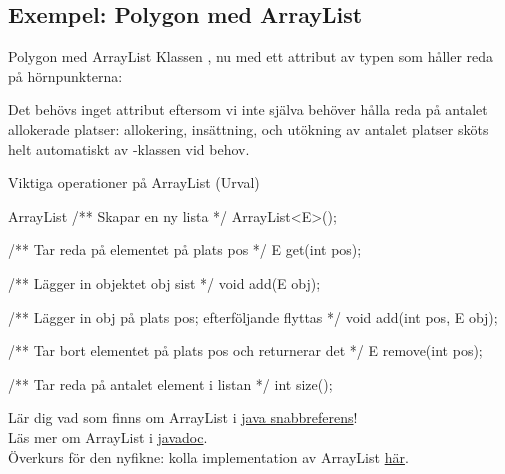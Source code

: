 \subsection{Exempel: Polygon med ArrayList}
\begin{Slide}{Polygon med ArrayList}
Klassen , nu med ett attribut av typen  som håller reda på hörnpunkterna:
\begin{Code}[numberstyle=]
public class Polygon {
    private ArrayList<Point> vertices; // lista med hörnpunkter
    
    /** Skapar en polygon */
    public Polygon() {
        vertices = new ArrayList<Point>();
    }
    
    ...
\end{Code}
Det behövs inget attribut  eftersom vi inte själva behöver hålla reda på antalet allokerade platser: allokering, insättning, och utökning av antalet platser sköts helt automatiskt av -klassen vid behov. 
\end{Slide}

\begin{Slide}{Viktiga operationer på ArrayList (Urval)}
\begin{JavaSpec}{ArrayList}
/** Skapar en ny lista */
ArrayList<E>();

/** Tar reda på elementet på plats pos */
E get(int pos);

/** Lägger in objektet obj sist */
void add(E obj);

/** Lägger in obj på plats pos; efterföljande flyttas */
void add(int pos, E obj);

/** Tar bort elementet på plats pos och returnerar det */
E remove(int pos);

/** Tar reda på antalet element i listan */
int size();
\end{JavaSpec}
Lär dig vad som finns om ArrayList i  \href{http://fileadmin.cs.lth.se/cs/Education/EDA016/general/quickref.pdf}{java snabbreferens}! \\
Läs mer om ArrayList i \href{https://docs.oracle.com/javase/8/docs/api/java/util/ArrayList.html}{javadoc}.\\
\footnotesize Överkurs för den nyfikne: kolla implementation av ArrayList \href{http://www.docjar.com/html/api/java/util/ArrayList.java.html}{här}.
\end{Slide}

